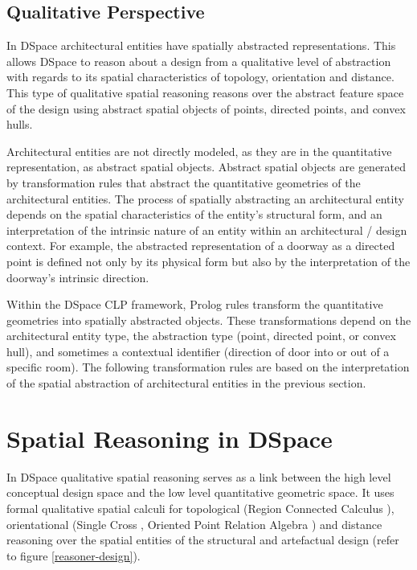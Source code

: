 \documentclass[12pt]{ucthesis}
\begin{document}
\subsection{Qualitative Perspective}
In DSpace architectural entities have spatially abstracted representations. This allows DSpace to reason about a design from a qualitative level of abstraction with regards to its spatial characteristics of topology, orientation and distance. This type of qualitative spatial reasoning reasons over the abstract feature space of the design using abstract spatial objects of points, directed points, and convex hulls. 

Architectural entities are not directly modeled, as they are in the quantitative representation, as abstract spatial objects. Abstract spatial objects are generated by transformation rules that abstract the quantitative geometries of the architectural entities. The process of spatially abstracting an architectural entity depends on the spatial characteristics of the entity's structural form, and an interpretation of the intrinsic nature of an entity within an architectural / design context. For example, the abstracted representation of a doorway as a directed point is defined not only by its physical form but also by the interpretation of the doorway's intrinsic direction. 

Within the DSpace CLP framework, Prolog rules transform the quantitative geometries into spatially abstracted objects. These transformations depend on the architectural entity type, the abstraction type (point, directed point, or convex hull), and sometimes a contextual identifier (direction of door into or out of a specific room). The following transformation rules are based on the interpretation of the spatial abstraction of architectural entities in the previous section.



\section{Spatial Reasoning in DSpace}
In DSpace qualitative spatial reasoning serves as a link between the high level conceptual design space and the low level quantitative geometric space. It uses formal qualitative spatial calculi for topological (Region Connected Calculus \cite{Freksa}), orientational (Single Cross \cite{Freksa}, Oriented Point Relation Algebra \cite{Moratz}) and distance reasoning over the spatial entities of the structural and artefactual design (refer to figure \ref{reasoner-design}). 
\end{document}
